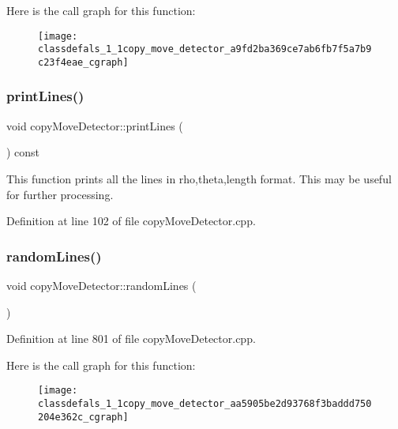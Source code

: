 Here is the call graph for this function\+:\nopagebreak
\begin{figure}[H]
\begin{center}
\leavevmode
\texttt{[image: classdefals\_1\_1copy\_move\_detector\_a9fd2ba369ce7ab6fb7f5a7b9c23f4eae\_cgraph]}
\end{center}
\end{figure}
\mbox{\label{classdefals_1_1copy_move_detector_a1dda27b106215ae248c5083536a2c001}} 
\subsubsection{\texorpdfstring{print\+Lines()}{printLines()}}
{\footnotesize\ttfamily void copy\+Move\+Detector\+::print\+Lines (\begin{DoxyParamCaption}{ }\end{DoxyParamCaption}) const}

This function prints all the lines in rho,theta,length format. This may be useful for further processing. 

Definition at line 102 of file copy\+Move\+Detector.\+cpp.

\mbox{\label{classdefals_1_1copy_move_detector_aa5905be2d93768f3baddd750204e362c}} 
\subsubsection{\texorpdfstring{random\+Lines()}{randomLines()}}
{\footnotesize\ttfamily void copy\+Move\+Detector\+::random\+Lines (\begin{DoxyParamCaption}{ }\end{DoxyParamCaption})}



Definition at line 801 of file copy\+Move\+Detector.\+cpp.

Here is the call graph for this function\+:\nopagebreak
\begin{figure}[H]
\begin{center}
\leavevmode
\texttt{[image: classdefals\_1\_1copy\_move\_detector\_aa5905be2d93768f3baddd750204e362c\_cgraph]}
\end{center}
\end{figure}
\mbox{\label{classdefals_1_1copy_move_detector_aa77b7daa6a859f58a09462d12d1a63ed}} 
